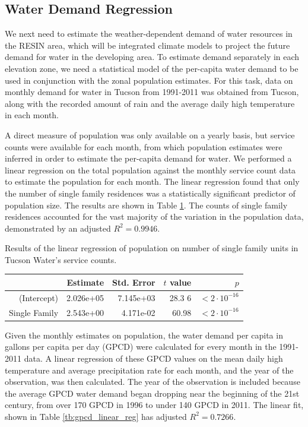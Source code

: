 \documentclass[opre,nonblindrev]{informs3} %
\begin{document}
\subsection{Water Demand Regression}
\label{ssec:demand_regression}

We next need to estimate the weather-dependent demand of water resources in the RESIN area, which will be integrated climate models to project the future demand for water in the developing area.
To estimate demand separately in each elevation zone, we need a statistical model of the per-capita water demand to be used in conjunction with the zonal population estimates.
For this task, data on monthly demand for water in Tucson from 1991-2011 was obtained from Tucson, along with the recorded amount of rain and the average daily high temperature in each month.

A direct measure of population was only available on a yearly basis, but service counts were available for each month, from which population estimates were inferred in order to estimate the per-capita demand for water.
We performed a linear regression on the total population against the monthly service count data to estimate the population for each month.
The linear regression found that only the number of single family residences was a statistically significant predictor of population size.
The results are shown in Table \ref{tb:population_linear_reg}.
The counts of single family residences accounted for the vast majority of the variation in the population data, demonstrated by an adjusted $R^2 = 0.9946$.

\begin{table}
	\TABLE
	{
		Results of the linear regression of population on number of single family units in Tucson Water's service counts.
		\label{tb:population_linear_reg}
	}
	{\begin{tabular}{rrrrr}
		\hline
						   & Estimate  & Std. Error & $t$ value & $p$ \\
		\hline
		(Intercept)    & 2.026e+05 & 7.145e+03  & 28.3 6    & $<2 \cdot 10^{-16}$ \\
		Single Family  & 2.543e+00 & 4.171e-02  & 60.98     & $<2 \cdot 10^{-16}$ \\
		\hline
	\end{tabular}}
	{}
\end{table}

Given the monthly estimates on population, the water demand per capita in gallons per capita per day (GPCD) were calculated for every month in the 1991-2011 data.
A linear regression of these GPCD values on the mean daily high temperature and average precipitation rate for each month, and the year of the observation, was then calculated.
The year of the observation is included because the average GPCD water demand began dropping near the beginning of the 21st century, from over 170 GPCD in 1996 to under 140 GPCD in 2011.
The linear fit, shown in Table \ref{tb:gpcd_linear_reg} has adjusted $R^2 = 0.7266$.
\end{document}
